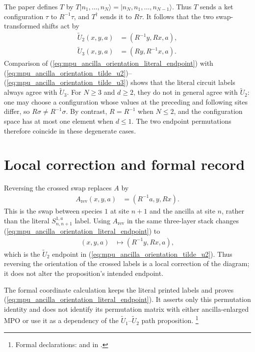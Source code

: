 \documentclass{article}
\begin{document}
The paper defines $T$ by
$T\lvert n_1,\ldots,n_N\rangle
    =\lvert n_N,n_1,\ldots,n_{N-1}\rangle$. Thus $T$ sends a ket configuration
$\tau$ to $R^{-1}\tau$, and $T^\dagger$ sends it to $R\tau$. It follows that
the two swap-transformed shifts act by
\begin{align}
    \widetilde U_2(x,y,a)
     & =(R^{-1}y,Rx,a),
    \label{eq:mpu_ancilla_orientation_tilde_u2} \\
    \widetilde U_3(x,y,a)
     & =(Ry,R^{-1}x,a).
    \label{eq:mpu_ancilla_orientation_tilde_u3}
\end{align}
Comparison of (\ref{eq:mpu_ancilla_orientation_literal_endpoint}) with
(\ref{eq:mpu_ancilla_orientation_tilde_u2})--
(\ref{eq:mpu_ancilla_orientation_tilde_u3}) shows that the literal circuit
labels always agree with $\widetilde U_3$. For $N\geq3$ and $d\geq2$, they do
not in general agree with $\widetilde U_2$: one may choose a configuration
whose values at the preceding and following sites differ, so
$R\sigma\neq R^{-1}\sigma$. By contrast, $R=R^{-1}$ when $N\leq2$, and the
configuration space has at most one element when $d\leq1$. The two endpoint
permutations therefore coincide in these degenerate cases.

\section{Local correction and formal record}

Reversing the crossed swap replaces $A$ by
\begin{align}
    A_{\mathrm{rev}}(x,y,a)
     & =(R^{-1}a,y,Rx).
    \label{eq:mpu_ancilla_orientation_reversed_crossed_swap}
\end{align}
This is the swap between species $1$ at site $n+1$ and the ancilla at site
$n$, rather than the literal $S^{1,a}_{n,n+1}$ label. Using
$A_{\mathrm{rev}}$ in the same three-layer stack changes
(\ref{eq:mpu_ancilla_orientation_literal_endpoint}) to
\begin{align}
    (x,y,a)
     & \longmapsto(R^{-1}y,Rx,a),
    \label{eq:mpu_ancilla_orientation_corrected_endpoint}
\end{align}
which is the $\widetilde U_2$ endpoint in
(\ref{eq:mpu_ancilla_orientation_tilde_u2}). Thus reversing the orientation
of the crossed labels is a local correction of the diagram; it does not alter
the proposition's intended endpoint.

The formal coordinate calculation keeps the literal printed labels and proves
(\ref{eq:mpu_ancilla_orientation_literal_endpoint}). It asserts only this
permutation identity and does not identify its permutation matrix with either
ancilla-enlarged MPO or use it as a dependency of the
$\widetilde U_1$--$\widetilde U_2$ path proposition.
\footnote{Formal declarations:
     and
     in
    .}
\end{document}
